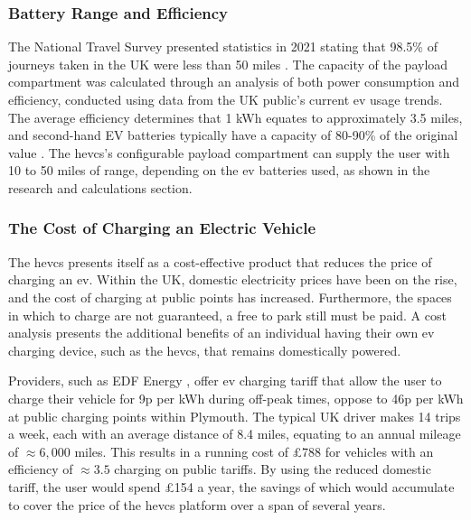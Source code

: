 \documentclass [12pt]{article}
\begin{document}
\subsubsection{Battery Range and Efficiency}

The National Travel Survey presented statistics in 2021 stating that 98.5\% of journeys taken in the UK were less than 50 miles \cite{nts}. The capacity of the payload compartment was calculated through an analysis of both power consumption and efficiency, conducted using data from the UK public’s current \gls{ev} usage trends. The average efficiency determines that 1 kWh equates to approximately 3.5 miles, and second-hand EV batteries typically have a capacity of 80-90\% of the original value \cite{strickland2014estimation}. The \gls{hevcs}’s configurable payload compartment can supply the user with 10 to 50 miles of range, depending on the \gls{ev} batteries used, as shown in the research and calculations section.

\subsubsection{The Cost of Charging an Electric Vehicle}
The \gls{hevcs} presents itself as a cost-effective product that reduces the price of charging an \gls{ev}. Within the UK, domestic electricity prices have been on the rise, and the cost of charging at public points has increased. Furthermore, the spaces in which to charge are not guaranteed, a free to park still must be paid. A cost analysis presents the additional benefits of an individual having their own \gls{ev} charging device, such as the \gls{hevcs}, that remains domestically powered.

Providers, such as EDF Energy \cite{edf}, offer \gls{ev} charging tariff that allow the user to charge their vehicle for 9p per kWh during off-peak times, oppose to 46p per kWh at public charging points within Plymouth. The typical UK driver makes 14 trips a week, each with an average distance of 8.4 miles, equating to an annual mileage of $ \approx 6,000 $ miles. This results in a running cost of £788 for vehicles with an efficiency of $ \approx 3.5 $ charging on public tariffs. By using the reduced domestic tariff, the user would spend £154 a year, the savings of which would accumulate to cover the price of the \gls{hevcs} platform over a span of several years.
\end{document}
